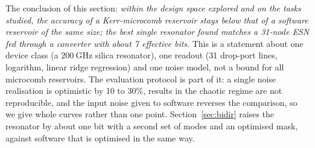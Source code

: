 The conclusion of this section: \emph{within the design space explored and on the tasks studied, the accuracy of a Kerr-microcomb
reservoir stays below that of a software reservoir of the same size; the best single resonator found matches a 31-node ESN fed through
a converter with about 7 effective bits}. This is a statement about one device class (a $200~\mathrm{GHz}$ silica resonator), one
readout (31 drop-port lines, logarithm, linear ridge regression) and one noise model, not a bound for all microcomb reservoirs. The
evaluation protocol is part of it: a single noise realisation is optimistic by 10 to 30\%, results in the chaotic regime are not
reproducible, and the input noise given to software reverses the comparison, so we give whole curves rather than one point.
Section~\ref{sec:bidir} raises the resonator by about one bit with a second set of modes and an optimised mask, against software that
is optimised in the same way.
